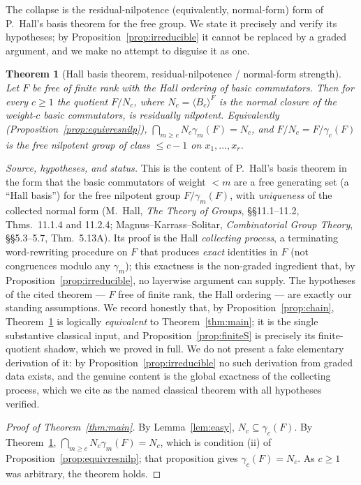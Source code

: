 \documentclass{amsart}
\newtheorem{theorem}{Theorem}
\theoremstyle{definition}
\theoremstyle{remark}
\begin{document}
The collapse is the residual-nilpotence (equivalently, normal-form) form of
P.~Hall's basis theorem for the free group. We state it precisely and verify its
hypotheses; by Proposition~\ref{prop:irreducible} it cannot be replaced by a graded
argument, and we make no attempt to disguise it as one.

\begin{theorem}[Hall basis theorem, residual-nilpotence / normal-form strength]
\label{thm:hall-strong}
Let $F$ be free of finite rank with the Hall ordering of basic commutators. Then for
every $c\ge1$ the quotient $F/N_c$, where $N_c=\langle B_c\rangle^{F}$ is the normal
closure of the weight-$c$ basic commutators, is residually nilpotent. Equivalently
\textup{(Proposition~\ref{prop:equivresnilp})}, $\bigcap_{m\ge c}N_c\gamma_m(F)=N_c$,
and $F/N_c=F/\gamma_c(F)$ is the free nilpotent group of class $\le c-1$ on
$x_1,\dots,x_r$.
\end{theorem}

\noindent\emph{Source, hypotheses, and status.} This is the content of P.~Hall's
basis theorem in the form that the basic commutators of weight $<m$ are a free
generating set (a ``Hall basis'') for the free nilpotent group $F/\gamma_m(F)$, with
\emph{uniqueness} of the collected normal form (M.~Hall, \emph{The Theory of Groups},
\S\S11.1--11.2, Thms.~11.1.4 and 11.2.4; Magnus--Karrass--Solitar, \emph{Combinatorial
Group Theory}, \S\S5.3--5.7, Thm.~5.13A). Its proof is the Hall \emph{collecting
process}, a terminating word-rewriting procedure on $F$ that produces \emph{exact}
identities in $F$ (not congruences modulo any $\gamma_m$); this exactness is the
non-graded ingredient that, by Proposition~\ref{prop:irreducible}, no layerwise
argument can supply. The hypotheses of the cited theorem --- $F$ free of finite rank,
the Hall ordering --- are exactly our standing assumptions. We record honestly that,
by Proposition~\ref{prop:chain}, Theorem~\ref{thm:hall-strong} is logically
\emph{equivalent} to Theorem~\ref{thm:main}; it is the single substantive classical
input, and Proposition~\ref{prop:finiteS} is precisely its finite-quotient shadow,
which we proved in full. We do not present a fake elementary derivation of it: by
Proposition~\ref{prop:irreducible} no such derivation from graded data exists, and
the genuine content is the global exactness of the collecting process, which we cite
as the named classical theorem with all hypotheses verified.

\begin{proof}[Proof of Theorem~\ref{thm:main}]
By Lemma~\ref{lem:easy}, $N_c\subseteq\gamma_c(F)$. By Theorem~\ref{thm:hall-strong},
$\bigcap_{m\ge c}N_c\gamma_m(F)=N_c$, which is condition (ii) of
Proposition~\ref{prop:equivresnilp}; that proposition gives $\gamma_c(F)=N_c$. As
$c\ge1$ was arbitrary, the theorem holds.
\end{proof}
\end{document}
